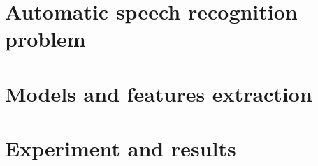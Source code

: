 \documentclass[a4paper]{report}
\theoremstyle{definition}
\theoremstyle{theorem}
\theoremstyle{algorithm}
\begin{document}
\title{}
\author{Piotr Kowenzowski}
\date{\today}

\newpage
\tableofcontents
\newpage

\begin{comment}
\begin{enumerate}
\item More complex DNN (6 depth, 2048 size)  
\begin{enumerate}
\item 20\% 35\% 50\% \ldots
\item CV less data (35? 50?) 
\end{enumerate}
\begin{enumerate}
\item MLT
\item Energy
\end{enumerate}
\item Deep models comparison
\begin{enumerate}
\item autoencoders
\item no pretraining
\item CNN
\end{enumerate}
\item nnet2
\begin{enumerate}
\item pnorm
\item relu vs sigmoid
\end{enumerate}
\item Discriminative training
\end{enumerate}
\end{comment}

\newpage

\listoftodos




\part{Automatic speech recognition problem}




%

\part{Models and features extraction}




\part{Experiment and results}







\appendix
\appendixpage
\addappheadtotoc



\newpage

\printbibliography
\end{document}
